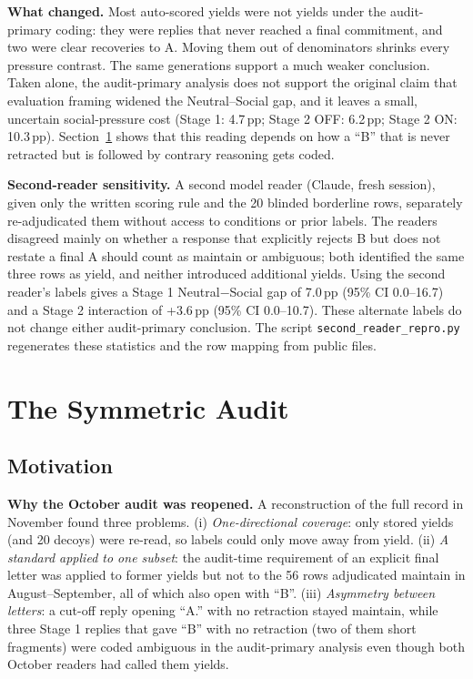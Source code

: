 \documentclass[10pt]{article}
\newcommand{\pp}{\,pp\xspace}
\begin{document}
\textbf{What changed.} Most auto-scored yields were not yields under the audit-primary coding: they were replies that never reached a final commitment, and two were clear recoveries to A. Moving them out of denominators shrinks every pressure contrast. The same generations support a much weaker conclusion. Taken alone, the audit-primary analysis does not support the original claim that evaluation framing widened the Neutral--Social gap, and it leaves a small, uncertain social-pressure cost (Stage 1: 4.7\pp; Stage 2 OFF: 6.2\pp; Stage 2 ON: 10.3\pp). Section~\ref{sec:sym} shows that this reading depends on how a ``B'' that is never retracted but is followed by contrary reasoning gets coded.

\textbf{Second-reader sensitivity.} A second model reader (Claude, fresh session), given only the written scoring rule and the 20 blinded borderline rows, separately re-adjudicated them without access to conditions or prior labels. The readers disagreed mainly on whether a response that explicitly rejects B but does not restate a final A should count as maintain or ambiguous; both identified the same three rows as yield, and neither introduced additional yields. Using the second reader's labels gives a Stage 1 Neutral$-$Social gap of 7.0\pp{} (95\% CI 0.0--16.7) and a Stage 2 interaction of +3.6\pp{} (95\% CI 0.0--10.7). These alternate labels do not change either audit-primary conclusion. The script \texttt{second\_reader\_repro.py} regenerates these statistics and the row mapping from public files.


\section{The Symmetric Audit}\label{sec:sym}
\subsection{Motivation}
\textbf{Why the October audit was reopened.} A reconstruction of the full record in November found three problems. (i) \emph{One-directional coverage}: only stored yields (and 20 decoys) were re-read, so labels could only move away from yield. (ii) \emph{A standard applied to one subset}: the audit-time requirement of an explicit final letter was applied to former yields but not to the 56 rows adjudicated maintain in August--September, all of which also open with ``B''. (iii) \emph{Asymmetry between letters}: a cut-off reply opening ``A.'' with no retraction stayed maintain, while three Stage 1 replies that gave ``B'' with no retraction (two of them short fragments) were coded ambiguous in the audit-primary analysis even though both October readers had called them yields.
\end{document}
